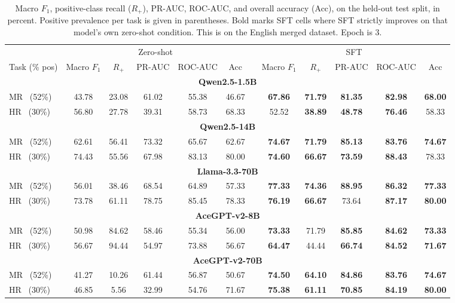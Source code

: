 \begin{table}[!htbp]
\centering
\caption{Macro $F_1$, positive-class recall ($R_{+}$), PR-AUC, ROC-AUC,
and overall accuracy (Acc), on the held-out test split, in percent. Positive prevalence
per task is given in parentheses. Bold marks SFT cells where
SFT strictly improves on that model's own zero-shot condition. This is on the English merged dataset. Epoch is 3.}
\label{tab:llm-results-merged-en-ep3}
\setlength{\tabcolsep}{5pt}
\small
\begin{tabular}{l ccccc c ccccc}
\toprule
 & \multicolumn{5}{c}{Zero-shot} & & \multicolumn{5}{c}{SFT} \\
\cmidrule(lr){2-6}\cmidrule(lr){8-12}
Task (\% pos)
 & Macro $F_1$ & $R_{+}$ & PR-AUC & ROC-AUC & Acc & & Macro $F_1$ & $R_{+}$ & PR-AUC & ROC-AUC & Acc \\
\midrule
\multicolumn{12}{c}{\textbf{Qwen2.5-1.5B}} \\
\midrule
MR \ (52\%) & 43.78 & 23.08 & 61.02 & 55.38 & 46.67 & & \textbf{67.86} & \textbf{71.79} & \textbf{81.35} & \textbf{82.98} & \textbf{68.00} \\
HR \ (30\%) & 56.80 & 27.78 & 39.31 & 58.73 & 68.33 & & 52.52 & \textbf{38.89} & \textbf{48.78} & \textbf{76.46} & 58.33 \\
\midrule
\midrule
\multicolumn{12}{c}{\textbf{Qwen2.5-14B}} \\
\midrule
MR \ (52\%) & 62.61 & 56.41 & 73.32 & 65.67 & 62.67 & & \textbf{74.67} & \textbf{71.79} & \textbf{85.13} & \textbf{83.76} & \textbf{74.67} \\
HR \ (30\%) & 74.43 & 55.56 & 67.98 & 83.13 & 80.00 & & \textbf{74.60} & \textbf{66.67} & \textbf{73.59} & \textbf{88.43} & 78.33 \\
\midrule
\midrule
\multicolumn{12}{c}{\textbf{Llama-3.3-70B}} \\
\midrule
MR \ (52\%) & 56.01 & 38.46 & 68.54 & 64.89 & 57.33 & & \textbf{77.33} & \textbf{74.36} & \textbf{88.95} & \textbf{86.32} & \textbf{77.33} \\
HR \ (30\%) & 73.78 & 61.11 & 78.75 & 85.45 & 78.33 & & \textbf{76.19} & \textbf{66.67} & 73.64 & \textbf{87.17} & \textbf{80.00} \\
\midrule
\midrule
\multicolumn{12}{c}{\textbf{AceGPT-v2-8B}} \\
\midrule
MR \ (52\%) & 50.98 & 84.62 & 58.46 & 55.34 & 56.00 & & \textbf{73.33} & 71.79 & \textbf{85.85} & \textbf{84.62} & \textbf{73.33} \\
HR \ (30\%) & 56.67 & 94.44 & 54.97 & 73.88 & 56.67 & & \textbf{64.47} & 44.44 & \textbf{66.74} & \textbf{84.52} & \textbf{71.67} \\
\midrule
\midrule
\multicolumn{12}{c}{\textbf{AceGPT-v2-70B}} \\
\midrule
MR \ (52\%) & 41.27 & 10.26 & 61.44 & 56.87 & 50.67 & & \textbf{74.50} & \textbf{64.10} & \textbf{84.86} & \textbf{83.76} & \textbf{74.67} \\
HR \ (30\%) & 46.85 & 5.56 & 32.99 & 54.76 & 71.67 & & \textbf{75.38} & \textbf{61.11} & \textbf{70.85} & \textbf{84.19} & \textbf{80.00} \\
\bottomrule
\end{tabular}
\end{table}

